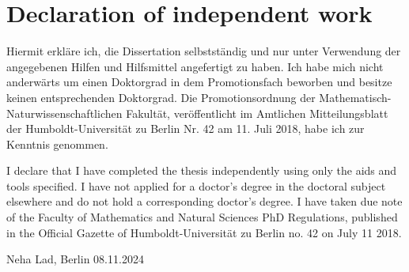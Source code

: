 \chapter*{Declaration of independent work}

Hiermit erkläre ich, die Dissertation selbstständig und nur unter Verwendung der angegebenen Hilfen und Hilfsmittel angefertigt zu haben. Ich habe mich nicht anderwärts um einen Doktorgrad in dem Promotionsfach beworben und besitze keinen entsprechenden Doktorgrad. Die Promotionsordnung der Mathematisch-Naturwissenschaftlichen Fakultät, veröffentlicht im Amtlichen Mitteilungsblatt der Humboldt-Universität zu Berlin Nr. 42 am 11. Juli 2018, habe ich zur Kenntnis genommen.

I declare that I have completed the thesis independently using only the aids and tools specified. I have not applied for a doctor's degree in the doctoral subject elsewhere and do not hold a corresponding doctor's degree. I have taken due note of the Faculty of Mathematics and Natural Sciences PhD Regulations, published in the Official Gazette of Humboldt-Universität zu Berlin no. 42 on July 11 2018.

\vspace{1cm}

Neha Lad, Berlin 08.11.2024